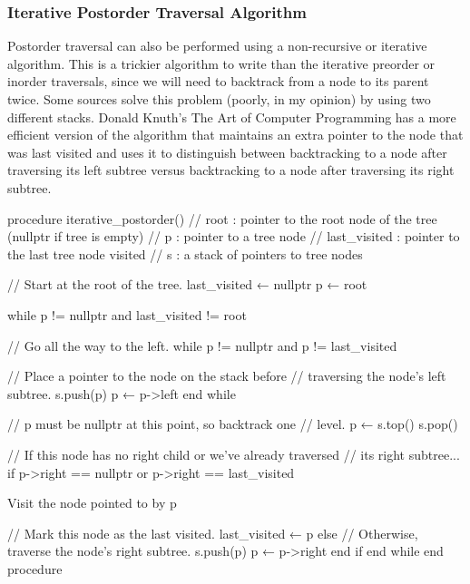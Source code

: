 \documentclass{report}
\begin{document}
    \subsubsection{Iterative Postorder Traversal Algorithm}
    \bigbreak \noindent 
    Postorder traversal can also be performed using a non-recursive or iterative algorithm. This is a trickier algorithm to write than the iterative preorder or inorder traversals, since we will need to backtrack from a node to its parent twice. Some sources solve this problem (poorly, in my opinion) by using two different stacks. Donald Knuth's The Art of Computer Programming has a more efficient version of the algorithm that maintains an extra pointer to the node that was last visited and uses it to distinguish between backtracking to a node after traversing its left subtree versus backtracking to a node after traversing its right subtree.
    \bigbreak \noindent 
    \begin{cppcode}
    procedure iterative_postorder()
        // root         : pointer to the root node of the tree (nullptr if tree is empty)
        // p            : pointer to a tree node
        // last_visited : pointer to the last tree node visited
        // s            : a stack of pointers to tree nodes

        // Start at the root of the tree.
        last_visited ← nullptr
        p ← root

        while p != nullptr and last_visited != root
       
            // Go all the way to the left.
            while p != nullptr and p != last_visited
     
                // Place a pointer to the node on the stack before
                // traversing the node's left subtree.
                s.push(p)
                p ← p->left
            end while

            // p must be nullptr at this point, so backtrack one
            // level.
            p ← s.top()
            s.pop()

            // If this node has no right child or we've already traversed
            // its right subtree...
            if p->right == nullptr or p->right == last_visited

                Visit the node pointed to by p

                // Mark this node as the last visited.
                last_visited ← p
            else
                // Otherwise, traverse the node's right subtree.
                s.push(p)
                p ← p->right
            end if
        end while
    end procedure
    \end{cppcode}
\end{document}
